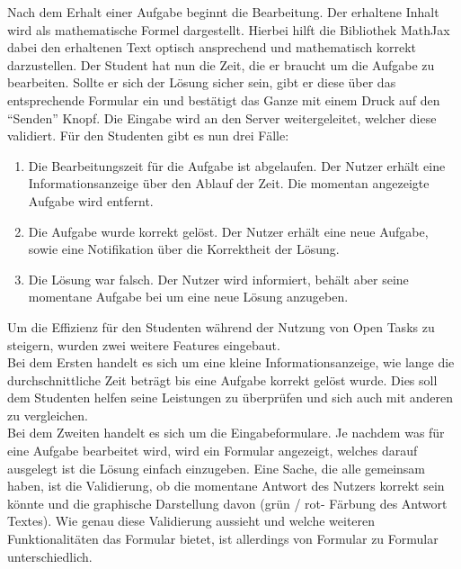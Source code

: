 Nach dem Erhalt einer Aufgabe beginnt die Bearbeitung. Der erhaltene Inhalt wird als mathematische Formel dargestellt. Hierbei hilft die Bibliothek MathJax dabei den erhaltenen Text optisch ansprechend und mathematisch korrekt darzustellen. Der Student hat nun die Zeit, die er braucht um die Aufgabe zu bearbeiten. Sollte er sich der Lösung sicher sein, gibt er diese über das entsprechende Formular ein und bestätigt das Ganze mit einem Druck auf den ``Senden'' Knopf. Die Eingabe wird an den Server weitergeleitet, welcher diese validiert. Für den Studenten gibt es nun drei Fälle: \\
\begin{enumerate}
\itemsep0em
\item Die Bearbeitungszeit für die Aufgabe ist abgelaufen. Der Nutzer erhält eine Informationsanzeige über den Ablauf der Zeit. Die momentan angezeigte Aufgabe wird entfernt.
\item Die Aufgabe wurde korrekt gelöst. Der Nutzer erhält eine neue Aufgabe, sowie eine Notifikation über die Korrektheit der Lösung.
\item Die Lösung war falsch. Der Nutzer wird informiert, behält aber seine momentane Aufgabe bei um eine neue Lösung anzugeben.
\end{enumerate} 

Um die Effizienz für den Studenten während der Nutzung von Open Tasks zu steigern, wurden zwei weitere Features eingebaut.\\ Bei dem Ersten handelt es sich um eine kleine Informationsanzeige, wie lange die durchschnittliche Zeit beträgt bis eine Aufgabe korrekt gelöst wurde. Dies soll dem Studenten helfen seine Leistungen zu überprüfen und sich auch mit anderen zu vergleichen. \\
Bei dem Zweiten handelt es sich um die Eingabeformulare. Je nachdem was für eine Aufgabe bearbeitet wird, wird ein Formular angezeigt, welches darauf ausgelegt ist die Lösung einfach einzugeben. Eine Sache, die alle gemeinsam haben, ist die Validierung, ob die momentane Antwort des Nutzers korrekt sein könnte und die graphische Darstellung davon (grün / rot- Färbung des Antwort Textes). Wie genau diese Validierung aussieht und welche weiteren Funktionalitäten das Formular bietet, ist allerdings von Formular zu Formular unterschiedlich.

